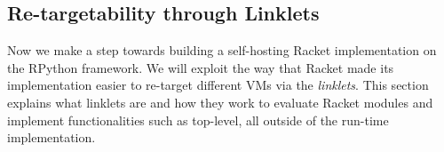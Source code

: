 \subsection{Re-targetability through Linklets}
\label{subsec:linklets}

Now we make a step towards building a self-hosting Racket
implementation on the RPython framework. We will exploit the way that
Racket made its implementation easier to re-target different VMs via
the \emph{linklets}. This section explains what linklets are and how
they work to evaluate Racket modules and implement functionalities
such as top-level, all outside of the run-time implementation.



